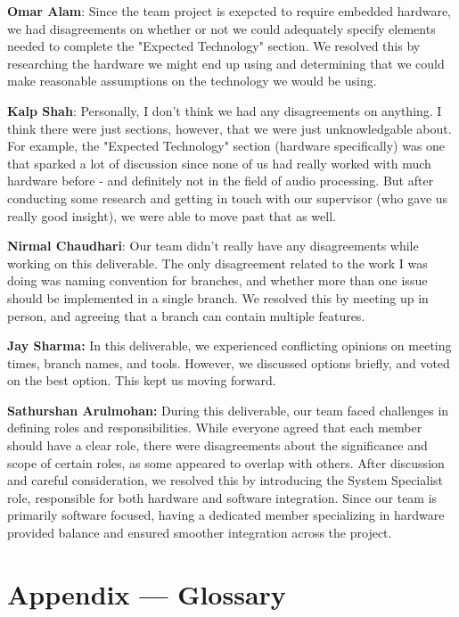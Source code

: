 \documentclass{article}
\begin{document}
\begin{enumerate}
    \textbf{Omar Alam}: Since the team project is exepcted to require embedded hardware, we had disagreements on whether or not we could adequately
    specify elements needed to complete the "Expected Technology" section. We resolved this by researching the hardware we might end up using and 
    determining that we could make reasonable assumptions on the technology we would be using.

    \textbf{Kalp Shah}: Personally, I don't think we had any disagreements on anything. I think there were just sections, however, that we were just
    unknowledgable about. For example, the "Expected Technology" section (hardware specifically) was one that sparked a lot of discussion since none
    of us had really worked with much hardware before - and definitely not in the field of audio processing. But after conducting some research
    and getting in touch with our supervisor (who gave us really good insight), we were able to move past that as well. 
    
    \textbf{Nirmal Chaudhari}: Our team didn't really have any disagreements while working on this deliverable. 
    The only disagreement related to the work I was doing was naming convention for branches, and whether more than one issue should be implemented in a single branch. 
    We resolved this by meeting up in person, and agreeing that a branch can contain multiple features. 
    
    \textbf{Jay Sharma:} In this deliverable, we experienced conflicting opinions on meeting times, branch names, and tools.
    However, we discussed options briefly, and voted on the best option. This kept us moving forward.

    \textbf{Sathurshan Arulmohan:} During this deliverable, our team faced challenges in defining roles and responsibilities.
    While everyone agreed that each member should have a clear role, there were disagreements about the significance and scope of certain roles, as some appeared to overlap with others.
    After discussion and careful consideration, we resolved this by introducing the System Specialist role, responsible for both hardware and software integration.
    Since our team is primarily software focused, having a dedicated member specializing in hardware provided balance and ensured smoother integration across the project.

\end{enumerate}

\newpage{}

\section*{Appendix --- Glossary}
\end{document}
